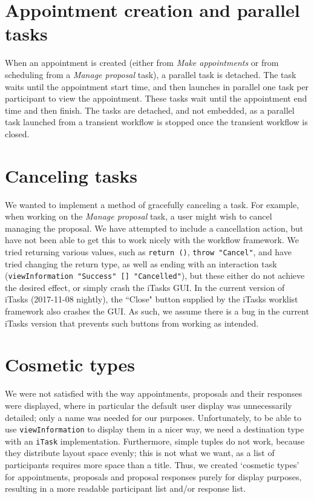 \documentclass{article}
\begin{document}
    \section{Appointment creation and parallel tasks}
	When an appointment is created (either from \emph{Make appointments} or from scheduling from a \emph{Manage proposal} task), a parallel task is detached.
	The task waits until the appointment start time, and then launches in parallel one task per participant to view the appointment.
	These tasks wait until the appointment end time and then finish.
	The tasks are detached, and not embedded, as a parallel task launched from a transient workflow is stopped once the transient workflow is closed.
    
    \section{Canceling tasks}
	We wanted to implement a method of gracefully canceling a task.
	For example, when working on the \emph{Manage proposal} task, a user might wish to cancel managing the proposal.
	We have attempted to include a cancellation action, but have not been able to get this to work nicely with the workflow framework.
	We tried returning various values, such as \lstinline|return ()|, \lstinline|throw "Cancel"|, and have tried changing the return type, as well as ending with an interaction task (\lstinline|viewInformation "Success" [] "Cancelled"|), but these either do not achieve the desired effect, or simply crash the iTasks GUI.
	In the current version of iTasks (2017-11-08 nightly), the ``Close" button supplied by the iTasks worklist framework also crashes the GUI.
	As such, we assume there is a bug in the current iTasks version that prevents such buttons from working as intended.
    
    \section{Cosmetic types}
	We were not satisfied with the way appointments, proposals and their responses were displayed, where in particular the default user display was unnecessarily detailed; only a name was needed for our purposes.
    Unfortunately, to be able to use \lstinline|viewInformation| to display them in a nicer way, we need a destination type with an \lstinline|iTask| implementation.
    Furthermore, simple tuples do not work, because they distribute layout space evenly; this is not what we want, as a list of participants requires more space than a title.
    Thus, we created `cosmetic types' for appointments, proposals and proposal responses purely for display purposes, resulting in a more readable participant list and/or response list.
	
\end{document}
